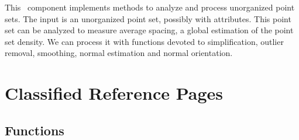 


This \cgal\ component implements methods to analyze and process unorganized point sets. The input is an unorganized point set, possibly with attributes. This point set can be analyzed to measure average spacing, a global estimation of the point set density. We can process it with functions devoted to simplification, outlier removal, smoothing, normal estimation and normal orientation. 

\section{Classified Reference Pages}

\subsection{Functions}

  \\
  \\
  \\
  \\
  \\
  \\
  \\
  \\
  \\
  \\
  \\
  \\

